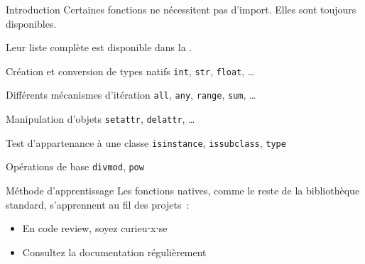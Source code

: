 \begin{frame}{Introduction}
  Certaines fonctions ne nécessitent pas d'import. Elles sont toujours disponibles.

  Leur liste complète est disponible dans la .
\end{frame}

\begin{frame}{Création et conversion de types natifs}
  \texttt{int}, \texttt{str}, \texttt{float}, …
\end{frame}

\begin{frame}{Différents mécanismes d'itération}
  \texttt{all}, \texttt{any}, \texttt{range}, \texttt{sum}, …
\end{frame}

\begin{frame}{Manipulation d'objets}
  \texttt{setattr}, \texttt{delattr}, …
\end{frame}

\begin{frame}{Test d'appartenance à une classe}
  \texttt{isinstance}, \texttt{issubclass}, \texttt{type}
\end{frame}

\begin{frame}{Opérations de base}
  \texttt{divmod}, \texttt{pow}
\end{frame}

\begin{frame}{Méthode d'apprentissage}
  Les fonctions natives, comme le reste de la bibliothèque standard, s'apprennent au fil des projets~:

  \begin{itemize}[<+(1)->]
    \item En code review, soyez curieu⋅x⋅se
    \item Consultez la documentation régulièrement
  \end{itemize}
\end{frame}
